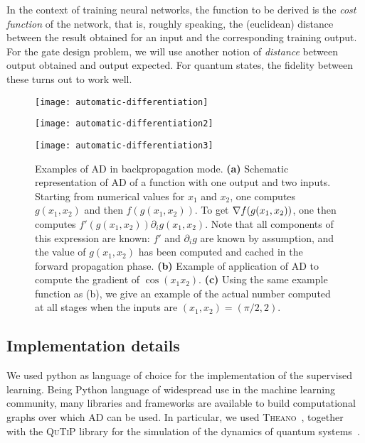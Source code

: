 In the context of training neural networks, the function to be derived is the \emph{cost function} of the network, that is, roughly speaking, the (euclidean) distance between the result obtained for an input and the corresponding training output.
For the gate design problem, we will use another notion of \emph{distance} between output obtained and output expected.
For quantum states, the fidelity between these turns out to work well.

\begin{figure}[tb]
	\centering
	\begin{minipage}{0.3\linewidth}
		\centering
		\texttt{[image: automatic-differentiation]}
	\end{minipage}\hfill
	\begin{minipage}{0.3\linewidth}
		\centering
		\texttt{[image: automatic-differentiation2]}
	\end{minipage}\hfill
	\begin{minipage}{0.3\linewidth}
		\centering
		\texttt{[image: automatic-differentiation3]}
	\end{minipage}
	\caption{
		Examples of \ac{AD} in backpropagation mode.
		\textbf{(a)}
		Schematic representation of \ac{AD} of a function with one output and two inputs.
		Starting from numerical values for $x_1$ and $x_2$, one computes $g(x_1, x_2)$ and then $f(g(x_1, x_2))$.
		To get $\nabla f(g(x_1, x_2))$, one then computes $f'(g(x_1, x_2))\partial_i g(x_1, x_2)$.
		Note that all components of this expression are known: $f'$ and $\partial_i g$ are known by assumption, and the value of $g(x_1, x_2)$ has been computed and cached in the forward propagation phase.
		\textbf{(b)} Example of application of \ac{AD} to compute the gradient of $\cos(x_1 x_2)$.
		\textbf{(c)} Using the same example function as (b), we give an example of the actual number computed at all stages when the inputs are $(x_1, x_2) = (\pi / 2, 2)$.
	}
	\label{fig:automatic-differentiation}
\end{figure}

\subsection{Implementation details}
\label{subsec:GL:implementation_details}

We used python as language of choice for the implementation of the supervised learning.
Being Python language of widespread use in the machine learning community, many libraries and frameworks are available to build computational graphs over which \ac{AD} can be used.
In particular, we used \textsc{Theano}~\cite{team2016theano}, together with the \textsc{QuTiP} library for the simulation of the dynamics of quantum systems~\cite{johansson2012qutip,johansson2013qutip}.

